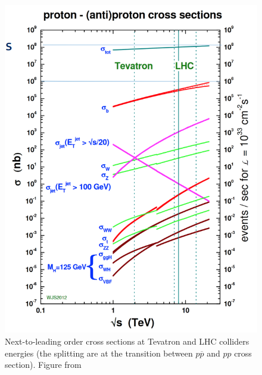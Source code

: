 \begin{figure}[!htb]
	\centering 
	\includegraphics[width=12cm]{img/StandardModelCrossSections_color.png}
	\caption{Next-to-leading order cross sections at Tevatron and LHC colliders energies (the splitting are at the transition between $p\overline{p}$ and $pp$ cross section). Figure from \cite{StirlingPrivate}}
	\label{figure:StandardModelCrossSections}
\end{figure}

